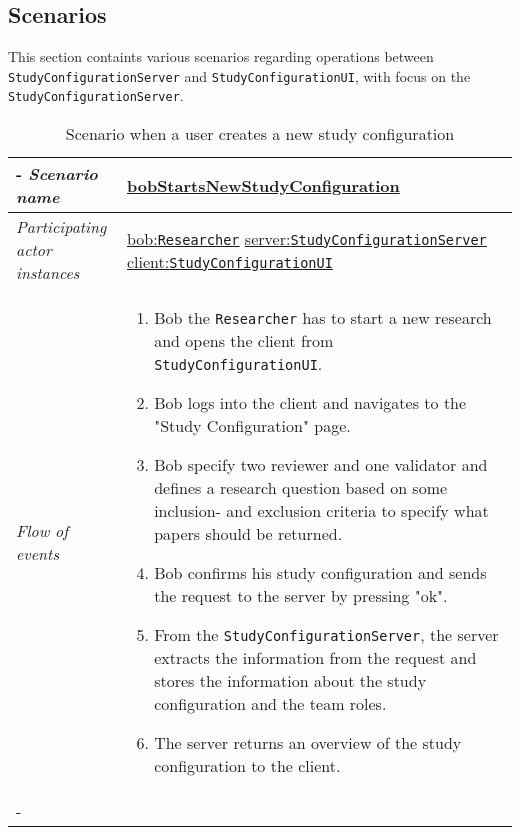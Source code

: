 

\subsection{Scenarios}
%
%
\newcommand{\researcher}{\texttt{Researcher}\xspace}
\newcommand{\clientside}{\texttt{StudyConfigurationUI}\xspace}
\newcommand{\invalidUser}{\texttt{InvalidUser}\xspace}
\newcommand{\serverside}{\texttt{StudyConfigurationServer}\xspace}
\newcommand{\incident}{\texttt{Incident}\xspace}
\newcommand{\reportemergency}{\texttt{ReportEmergency}\xspace}
\newcommand{\openincident}{\texttt{OpenIncident}\xspace}


This section containts various scenarios regarding operations between \serverside and \clientside, with focus on the \serverside.

%
%
\begin{table}[h!]
\tabulinesep=1.5mm
\begin{tabu} to 
	\tabucline[1.5pt]-
	\textit{Scenario name} & \underline{bobStartsNewStudyConfiguration} \\
	\hline
	\textit{Participating actor \newline instances} & \underline{bob:\researcher} \newline \underline{server:\serverside}
	\newline \underline{client:\clientside} \\
	\hline
	\textit{Flow of events} &
	\vspace{-3mm}
	\begin{enumerate}[leftmargin=*,topsep=0pt,itemsep=-1ex]
		\item Bob the \researcher has to start a new research  and opens the client from \clientside. 
		\item Bob logs into the client and navigates to the "Study Configuration" page. 
		
		\item Bob specify two reviewer and one validator and defines a research question based on some inclusion- and exclusion criteria to specify what papers should be returned. 
		
		\item Bob confirms his study configuration and sends the request to the server by pressing "ok".
		
		\item From the \serverside, the server extracts the information from the request and stores the information about the study configuration and the team roles.
		
		\item The server returns an overview of the study configuration to the client.
	\end{enumerate} \\
	\tabucline[1.5pt]-
\end{tabu}
\caption{Scenario when a user creates a new study configuration}
\label{sc:bobStartsNewStudyConfiguration}
\end{table}


